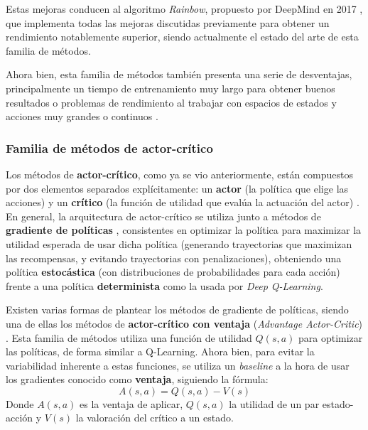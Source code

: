 Estas mejoras conducen al algoritmo \textit{Rainbow}, propuesto por DeepMind en 2017 \cite{DBLP:journals/corr/abs-1710-02298}, que implementa todas las mejoras discutidas previamente para obtener un rendimiento notablemente superior, siendo actualmente el estado del arte de esta familia de métodos.

Ahora bien, esta familia de métodos también presenta una serie de desventajas, principalmente un tiempo de entrenamiento muy largo para obtener buenos resultados \cite{10.5555/3161223} o problemas de rendimiento al trabajar con espacios de estados y acciones muy grandes o continuos \cite{DBLP:journals/corr/abs-1811-12560}.

\subsubsection{Familia de métodos de actor-crítico}

Los métodos de \textbf{actor-crítico}, como ya se vio anteriormente, están compuestos por dos elementos separados explícitamente: un \textbf{actor} (la política que elige las acciones) y un \textbf{crítico} (la función de utilidad que evalúa la actuación del actor) \cite{Sutton1998}. En general, la arquitectura de actor-crítico se utiliza junto a métodos de \textbf{gradiente de políticas} \cite{PETERS2008682}, consistentes en optimizar la política para maximizar la utilidad esperada de usar dicha política (generando trayectorias que maximizan las recompensas, y evitando trayectorias con penalizaciones), obteniendo una política \textbf{estocástica} (con distribuciones de probabilidades para cada acción) frente a una política \textbf{determinista} como la usada por \textit{Deep Q-Learning}. 

Existen varias formas de plantear los métodos de gradiente de políticas, siendo una de ellas los métodos de \textbf{actor-crítico con ventaja} (\textit{Advantage Actor-Critic}) \cite{DBLP:journals/corr/MnihBMGLHSK16}. Esta familia de métodos utiliza una función de utilidad $Q(s,a)$ para optimizar las políticas, de forma similar a Q-Learning. Ahora bien, para evitar la variabilidad inherente a estas funciones, se utiliza un \textit{baseline} a la hora de usar los gradientes conocido como \textbf{ventaja}, siguiendo la fórmula:
\[A(s,a)=Q(s,a)-V(s)\]
Donde $A(s,a)$ es la ventaja de aplicar, $Q(s,a)$ la utilidad de un par estado-acción y $V(s)$ la valoración del crítico a un estado.

